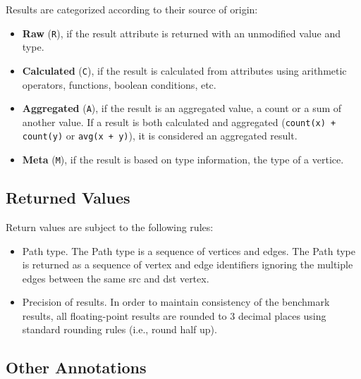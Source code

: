 Results are categorized according to their source of origin:

\begin{itemize}
	\item \textbf{Raw} (\texttt{R}), if the result attribute is returned with an unmodified value and type.
	\item \textbf{Calculated} (\texttt{C}), if the result is calculated from attributes using arithmetic operators, functions, boolean conditions, etc.
	\item \textbf{Aggregated} (\texttt{A}), if the result is an aggregated value, \eg a count or a sum of another value. If a result is both calculated and aggregated (\eg \lstinline{count(x) + count(y)} or \lstinline{avg(x + y)}), it is considered an aggregated result.
	\item \textbf{Meta} (\texttt{M}), if the result is based on type information, \eg the type of a vertice.
\end{itemize}


\subsection{Returned Values}
\label{subsec:returned-values}

Return values are subject to the following rules:
\begin{itemize}
    \item Path type. The Path type is a sequence of vertices and edges. The
          Path type is returned as a sequence of vertex and edge identifiers
          ignoring the multiple edges between the same src and dst vertex.
    \item Precision of results. In order to maintain consistency of the 
          benchmark results, all floating-point results are rounded to 3
          decimal places using standard rounding rules (i.e., round half up).
\end{itemize}


\subsection{Other Annotations}
\label{subsec:other-annotations}

